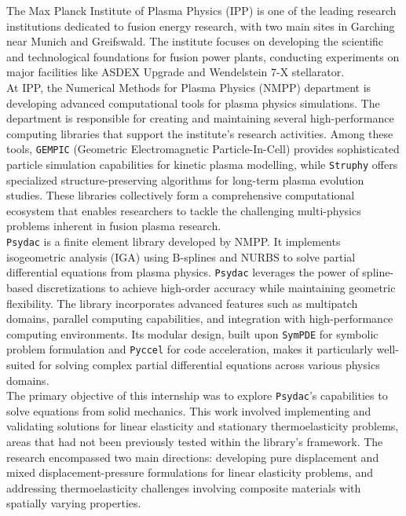 \documentclass[a4paper,12pt,twoside]{report}
\begin{document}
The Max Planck Institute of Plasma Physics (IPP) is one of the leading research institutions dedicated to fusion energy research, with two main sites in Garching near Munich and Greifswald. The institute focuses on developing the scientific and technological foundations for fusion power plants, conducting experiments on major facilities like ASDEX Upgrade and Wendelstein 7-X stellarator. \\

At IPP, the Numerical Methods for Plasma Physics (NMPP) department is developing advanced computational tools for plasma physics simulations. The department is responsible for creating and maintaining several high-performance computing libraries that support the institute's research activities. Among these tools, \texttt{GEMPIC} (Geometric Electromagnetic Particle-In-Cell) provides sophisticated particle simulation capabilities for kinetic plasma modelling, while \texttt{Struphy} offers specialized structure-preserving algorithms for long-term plasma evolution studies. These libraries collectively form a comprehensive computational ecosystem that enables researchers to tackle the challenging multi-physics problems inherent in fusion plasma research.\\

\texttt{Psydac} is a finite element library developed by NMPP. It implements isogeometric analysis (IGA) using B-splines and NURBS to solve partial differential equations from plasma physics. \texttt{Psydac} leverages the power of spline-based discretizations to achieve high-order accuracy while maintaining geometric flexibility. The library incorporates advanced features such as multipatch domains, parallel computing capabilities, and integration with high-performance computing environments. Its modular design, built upon \texttt{SymPDE} for symbolic problem formulation and \texttt{Pyccel} for code acceleration, makes it particularly well-suited for solving complex partial differential equations across various physics domains.\\

The primary objective of this internship was to explore \texttt{Psydac}'s capabilities to solve equations from solid mechanics. This work involved implementing and validating solutions for linear elasticity and stationary thermoelasticity problems, areas that had not been previously tested within the library's framework. The research encompassed two main directions: developing pure displacement and mixed displacement-pressure formulations for linear elasticity problems, and addressing thermoelasticity challenges involving composite materials with spatially varying properties.\\
\end{document}
